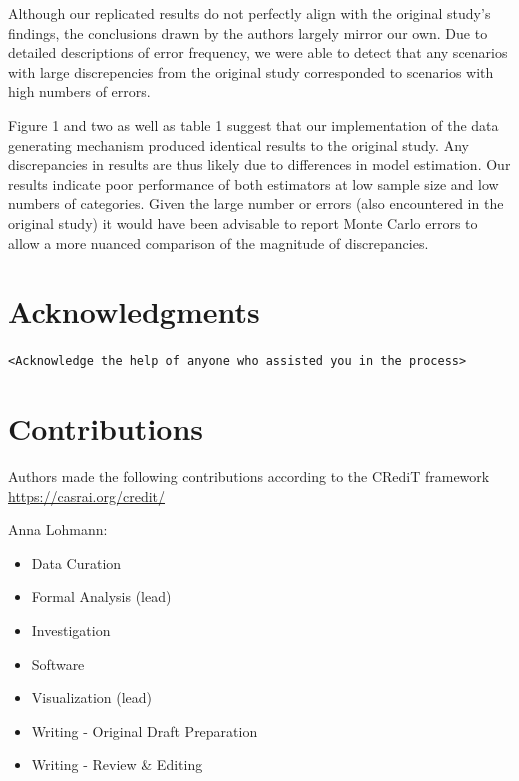 \documentclass[10,a4paperpaper,]{article}
\begin{document}
Although our replicated results do not perfectly align with the original
study's findings, the conclusions drawn by the authors largely mirror
our own. Due to detailed descriptions of error frequency, we were able
to detect that any scenarios with large discrepencies from the original
study corresponded to scenarios with high numbers of errors.

Figure 1 and two as well as table 1 suggest that our implementation of
the data generating mechanism produced identical results to the original
study. Any discrepancies in results are thus likely due to differences
in model estimation. Our results indicate poor performance of both
estimators at low sample size and low numbers of categories. Given the
large number or errors (also encountered in the original study) it would
have been advisable to report Monte Carlo errors to allow a more nuanced
comparison of the magnitude of discrepancies.

\section{Acknowledgments}

\texttt{\textless{}Acknowledge\ the\ help\ of\ anyone\ who\ assisted\ you\ in\ the\ process\textgreater{}}

\section{Contributions}

Authors made the following contributions according to the CRediT
framework \url{https://casrai.org/credit/}

Anna Lohmann:

\begin{itemize}
\tightlist
\item
  Data Curation\\
\item
  Formal Analysis (lead)\\
\item
  Investigation\\
\item
  Software\\
\item
  Visualization (lead)\\
\item
  Writing - Original Draft Preparation\\
\item
  Writing - Review \& Editing
\end{itemize}
\end{document}
